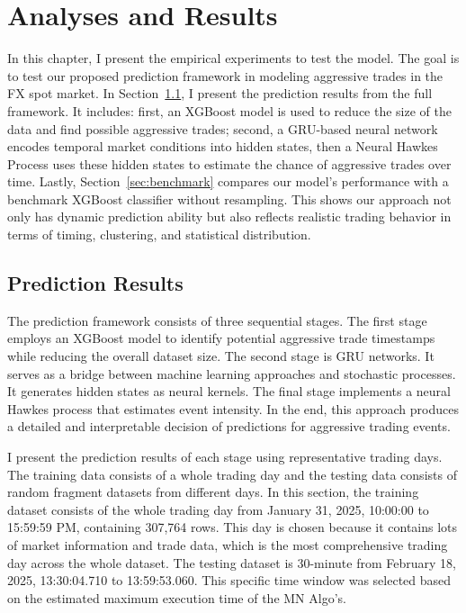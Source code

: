 \chapter{Analyses and Results}\label{chapter:experiments}
In this chapter, I present the empirical experiments to test the model. The goal is to test our proposed prediction framework in modeling aggressive trades in the FX spot market. In Section~\ref{sec:prediction}, I present the prediction results from the full framework. It includes: first, an XGBoost model is used to reduce the size of the data and find possible aggressive trades; second, a GRU-based neural network encodes temporal market conditions into hidden states, then a Neural Hawkes Process uses these hidden states to estimate the chance of aggressive trades over time. Lastly, Section~\ref{sec:benchmark} compares our model's performance with a benchmark XGBoost classifier without resampling. This shows our approach not only has dynamic prediction ability but also reflects realistic trading behavior in terms of timing, clustering, and statistical distribution.


\section{Prediction Results} \label{sec:prediction}
The prediction framework consists of three sequential stages. The first stage employs an XGBoost model to identify potential aggressive trade timestamps while reducing the overall dataset size. The second stage is GRU networks. It serves as a bridge between machine learning approaches and stochastic processes. It generates hidden states as neural kernels. The final stage implements a neural Hawkes process that estimates event intensity. In the end, this approach produces a detailed and interpretable decision of predictions for aggressive trading events.

I present the prediction results of each stage using representative trading days. The training data consists of a whole trading day and the testing data consists of random fragment datasets from different days. In this section, the training dataset consists of the whole trading day from January 31, 2025, 10:00:00 to 15:59:59 PM, containing 307,764 rows. This day is chosen because it contains lots of market information and trade data, which is the most comprehensive trading day across the whole dataset. The testing dataset is 30-minute from February 18, 2025, 13:30:04.710 to 13:59:53.060. 
This specific time window was selected based on the estimated maximum execution time of the MN Algo's.


